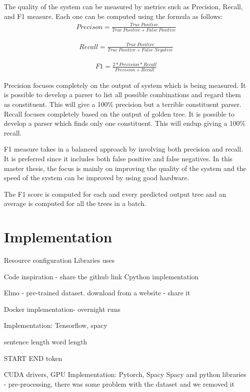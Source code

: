 \documentclass[a4paper, 11pt]{article}
\begin{document}
The quality of the system can be measured by metrics such as Precision, Recall, and F1 measure. Each one can be computed using the formula as follows:
\begin{align*}
Precison = \frac{True\ Positive} {True\ Positive + False\ Positive}
\end{align*}

\begin{align*}
Recall = \frac{True\ Positive} {True\ Positive + False\ Negative}
\end{align*}

\begin{align*}
F1 = \frac{2* Precision * Recall} {Precision + Recall}
\end{align*}

Precision focuses completely on the output of system which is being measured. It is possible to develop a parser to list all possible combinations and regard them as constituent. This will give a 100\% precision but a terrible constituent parser. Recall focuses completely based on the output of golden tree. It is possible to develop a parser which finds only one constituent. This will endup giving a 100\% recall.

F1 measure takes in a balanced approach by involving both precision and recall. It is preferred since it includes both false positive and false negatives. In this master thesis, the focus is mainly on improving the quality of the system and the speed of the system can be improved by using good hardware. 

The F1 score is computed for each and every predicted output tree and an average is computed for all the trees in a batch. 

\pagebreak
\section{Implementation}

Resource configuration
Libraries uses

Code inspiration - share the github link
Cpython implementation

Elmo - pre-trained dataset. download from a website - share it

Docker implementation- overnight runs 
 
Implementation: Tensorflow, spacy 

sentence length
word length

START END token

CUDA drivers, GPU
Implementation: Pytorch, Spacy
Spacy and python libraries - pre-processing, there was some problem with the dataset and we removed it
\end{document}
